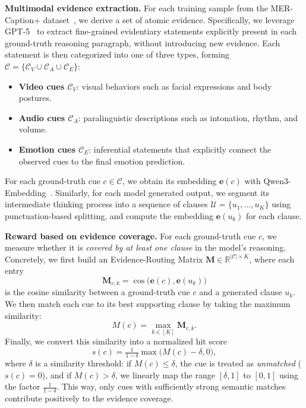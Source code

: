 \documentclass{article}
\theoremstyle{plain}
\theoremstyle{definition}
\theoremstyle{remark}
\begin{document}
\noindent\textbf{Multimodal evidence extraction.}
For each training sample from the MER-Caption+ dataset~\cite{lian2025affectgpt}, we derive a set of atomic evidence. 
Specifically, we leverage GPT-5~\cite{singh2025openai} to extract fine-grained evidentiary statements explicitly present in each ground-truth reasoning paragraph, without introducing new evidence.
Each statement is then categorized into one of three types, forming $\mathcal{C} =\{ \mathcal{C}_V \cup \mathcal{C}_A \cup \mathcal{C}_E\}$:
\begin{itemize}
    \item \textbf{Video cues $\mathcal{C}_V$}: visual behaviors such as facial expressions and body postures. 
    \item \textbf{Audio cues $\mathcal{C}_A$}: paralinguistic descriptions such as intonation, rhythm, and volume. 
    \item \textbf{Emotion cues $\mathcal{C}_E$}: inferential statements that explicitly connect the observed cues to the final emotion prediction.
\end{itemize}
For each ground-truth cue $c \in \mathcal{C}$, we obtain its embedding $\mathbf{e}(c)$ with Qwen3-Embedding~\cite{zhang2025qwen3}. Similarly, for each model generated output, we segment its intermediate thinking process into a sequence of  clauses $\mathcal{U} = \{u_1,\dots,u_K\}$ using punctuation-based splitting, and compute the embedding $\mathbf{e}(u_k)$ for each clause.



\noindent\textbf{Reward based on evidence coverage.}
For each ground-truth cue $c$, we measure whether it is \emph{covered by at least one clause} in the model’s reasoning. Concretely, we first build an Evidence-Routing Matrix $\mathbf{M}\in\mathbb{R}^{|\mathcal{C}|\times K}$, where each entry
\begin{equation}\label{eq:M}
    \mathbf{M}_{c,k} = \cos\bigl(\mathbf{e}(c), \mathbf{e}(u_k)\bigr)
\end{equation}
is the cosine similarity between a ground-truth cue $c$ and a generated clause $u_k$.
We then match each cue to its best supporting clause by taking the maximum similarity:
\begin{equation}
M(c)=\max_{k\in[K]}\mathbf{M}_{c,k}.
\end{equation}
Finally, we convert this similarity into a normalized hit score
\begin{equation}
\label{eq:cue_score}
s(c)=\tfrac{1}{1-\delta}\max\bigl({M}(c)-\delta,0\bigr),
\end{equation}
where $\delta$ is a similarity threshold: if ${M}(c)\le\delta$, the cue is treated as \emph{unmatched} ($s(c)=0$), and if ${M}(c)>\delta$, we linearly map the range $[\delta,1]$ to $[0,1]$ using the factor $\tfrac{1}{1-\delta}$. This way, only cues with sufficiently strong semantic matches contribute positively to the evidence coverage.
\end{document}
